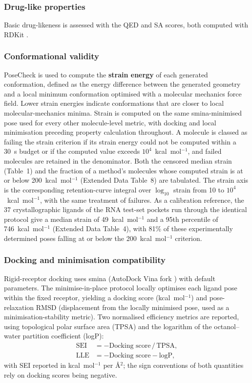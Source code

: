 \documentclass[pdflatex,sn-mathphys-num]{sn-jnl}
\theoremstyle{thmstyleone}
\theoremstyle{thmstyletwo}
\theoremstyle{thmstylethree}
\begin{document}
\subsubsection{Drug-like properties}

Basic drug-likeness is assessed with the QED \cite{bickerton2012qed} and SA \cite{ertl2009sa} scores, both computed with RDKit \cite{landrum2024rdkit}.

\subsubsection{Conformational validity}

PoseCheck \cite{harris2023posecheck} is used to compute the \textbf{strain energy} of each generated conformation, defined as the energy difference between the generated geometry and a local minimum conformation optimised with a molecular mechanics force field. Lower strain energies indicate conformations that are closer to local molecular-mechanics minima. Strain is computed on the same smina-minimised pose used for every other molecule-level metric, with docking and local minimisation preceding property calculation throughout. A molecule is classed as failing the strain criterion if its strain energy could not be computed within a 30~s budget or if the computed value exceeds $10^{4}$~kcal~mol$^{-1}$, and failed molecules are retained in the denominator. Both the censored median strain (Table~1) and the fraction of a method's molecules whose computed strain is at or below 200~kcal~mol$^{-1}$ (Extended Data Table~8) are tabulated. The strain axis is the corresponding retention-curve integral over $\log_{10}$ strain from 10 to $10^{4}$~kcal~mol$^{-1}$, with the same treatment of failures. As a calibration reference, the 37 crystallographic ligands of the RNA test-set pockets run through the identical protocol give a median strain of 49~kcal~mol$^{-1}$ and a 95th percentile of 746~kcal~mol$^{-1}$ (Extended Data Table~4), with 81\% of these experimentally determined poses falling at or below the 200~kcal~mol$^{-1}$ criterion.

\subsubsection{Docking and minimisation compatibility}

Rigid-receptor docking uses smina \cite{koes2013smina} (AutoDock Vina fork \cite{trott2010vina}) with default parameters. The minimise-in-place protocol locally optimises each ligand pose within the fixed receptor, yielding a docking score (kcal~mol$^{-1}$) and pose-relaxation RMSD (displacement from the locally minimised pose, used as a minimisation-stability metric). Two normalised efficiency metrics are reported, using topological polar surface area (TPSA) and the logarithm of the octanol--water partition coefficient (logP):
\begin{align}
\text{SEI} &= -\text{Docking score} \,/\, \text{TPSA}, \\
\text{LLE} &= -\text{Docking score} - \text{logP},
\end{align}
with SEI reported in kcal~mol$^{-1}$ per \AA$^{2}$; the sign conventions of both quantities rely on docking scores being negative.
\end{document}
